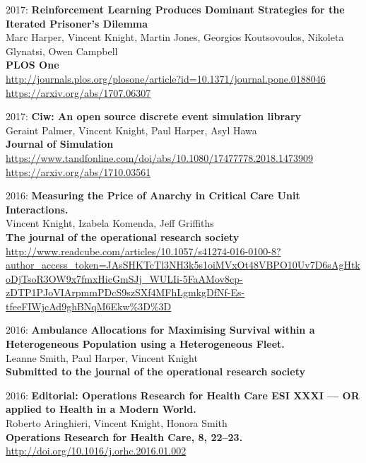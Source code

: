 \documentclass[10pt]{res} %
\begin{document}
\begin{resume}
\begin{etaremune}
\item
2017: \textbf{Reinforcement Learning Produces Dominant Strategies for the Iterated Prisoner's Dilemma}\\
Marc Harper, Vincent Knight, Martin Jones, Georgios Koutsovoulos, Nikoleta Glynatsi, Owen Campbell
\\
\textbf{PLOS One}
\\
\url{http://journals.plos.org/plosone/article?id=10.1371/journal.pone.0188046}
\\
\url{https://arxiv.org/abs/1707.06307}
\\

\item
2017: \textbf{Ciw: An open source discrete event simulation library}\\
Geraint Palmer, Vincent Knight, Paul Harper, Asyl Hawa
\\
\textbf{Journal of Simulation}
\\
\url{https://www.tandfonline.com/doi/abs/10.1080/17477778.2018.1473909}
\\
\url{https://arxiv.org/abs/1710.03561}
\\

\item
2016: \textbf{Measuring the Price of Anarchy in Critical Care Unit Interactions.}\\
Vincent Knight, Izabela Komenda, Jeff Griffiths
\\
\textbf{The journal of the operational research society}
\\
\url{http://www.readcube.com/articles/10.1057/s41274-016-0100-8?author_access_token=JAsSHKTcTl3NH3k5s1oiMVxOt48VBPO10Uv7D6sAgHtkoDjTsoR3OW9x7fmxHicGmSJj_WULIi-5FaAMov8cp-zDTP1PJoVIArpmmPDcS9szSXf4MFhLgmkgDfNf-Es-tfeeFIWjcAd9ghBNqM6Ekw%3D%3D}
\\

\item
2016: \textbf{Ambulance Allocations for Maximising Survival within a Heterogeneous Population using a Heterogeneous Fleet.}\\
Leanne Smith, Paul Harper, Vincent Knight
\\
\textbf{Submitted to the journal of the operational research society}
\\

\item
2016: \textbf{Editorial: Operations Research for Health Care ESI XXXI — OR applied to Health in a Modern World.}\\
Roberto Aringhieri, Vincent Knight, Honora Smith
\\
\textbf{Operations Research for Health Care, 8, 22–23.}
\\
\url{http://doi.org/10.1016/j.orhc.2016.01.002}
\\


\end{etaremune}
\end{resume}
\end{document}
